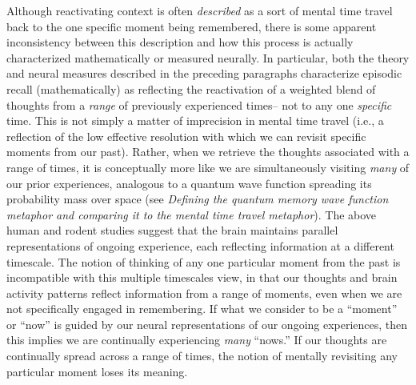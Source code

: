 \documentclass{article}
\begin{document}
Although reactivating context is often \textit{described} as a sort of mental time travel back to the one specific moment being remembered, there is some apparent inconsistency between this description and how this process is actually characterized mathematically or measured neurally.  In particular, both the theory and neural measures described in the preceding paragraphs characterize episodic recall (mathematically) as reflecting the reactivation of a weighted blend of thoughts from a \textit{range} of previously experienced times-- not to any one \textit{specific} time.  This is not simply a matter of imprecision in mental time travel (i.e., a reflection of the low effective resolution with which we can revisit specific moments from our past).  Rather, when we retrieve the thoughts associated with a range of times, it is conceptually more like we are simultaneously visiting \textit{many} of our prior experiences, analogous to a quantum wave function spreading its probability mass over space (see \textit{Defining the {\normalfont quantum memory wave function} metaphor and comparing it to the {\normalfont mental time travel} metaphor}). The above human and rodent studies suggest that the brain maintains parallel representations of ongoing experience, each reflecting information at a different timescale.  The notion of thinking of any one particular moment from the past is incompatible with this multiple timescales view, in that our thoughts and brain activity patterns reflect information from a range of moments, even when we are not specifically engaged in remembering.  If what we consider to be a ``moment'' or ``now'' is guided by our neural representations of our ongoing experiences, then this implies we are continually experiencing \textit{many} ``nows.''  If our thoughts are continually spread across a range of times, the notion of mentally revisiting any particular moment loses its meaning.
\end{document}
